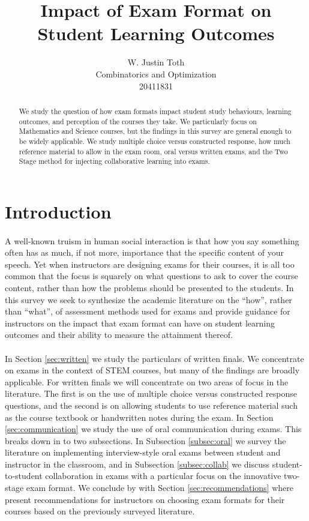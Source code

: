 \documentclass[12pt]{article}
\title{Impact of Exam Format on Student Learning Outcomes}
\author{W. Justin Toth\\Combinatorics and Optimization\\20411831}
\begin{document}
\maketitle
\begin{abstract}
We study the question of how exam formats impact student study behaviours, learning outcomes, and perception of the courses they take. We particularly focus on Mathematics and Science courses, but the findings in this survey are general enough to be widely applicable. We study multiple choice versus constructed response, how much reference material to allow in the exam room, oral versus written exams, and the Two Stage method for injecting collaborative learning into exams.
\end{abstract}
\newpage
\tableofcontents
\newpage
\section{Introduction}

\paragraph{}
A well-known truism in human social interaction is that how you say something often has as much, if not more, importance that the specific content of your speech. Yet when instructors are designing exams for their courses, it is all too common that the focus is squarely on what questions to ask to cover the course content, rather than how the problems should be presented to the students. In this survey we seek to synthesize the academic literature on the ``how'', rather than ``what'', of assessment methods used for exams and provide guidance for instructors on the impact that exam format can have on student learning outcomes and their ability to measure the attainment thereof.
\paragraph{}
In Section \ref{sec:written} we study the particulars of written finals. We concentrate on exams in the context of STEM courses, but many of the findings are broadly applicable. For written finals we will concentrate on two areas of focus in the literature. The first is on the use of multiple choice versus constructed response questions, and the second is on allowing students to use reference material such as the course textbook or handwritten notes during the exam. In Section \ref{sec:communication} we study the use of oral communication during exams. This breaks down in to two subsections. In Subsection \ref{subsec:oral} we survey the literature on implementing interview-style oral exams  between student and instructor in the classroom, and in Subsection \ref{subsec:collab} we discuss student-to-student collaboration in exams with a particular focus on the innovative two-stage exam format. We conclude by with Section \ref{sec:recommendations} where present recommendations for instructors on choosing exam formats for their courses based on the previously surveyed literature.
\end{document}
